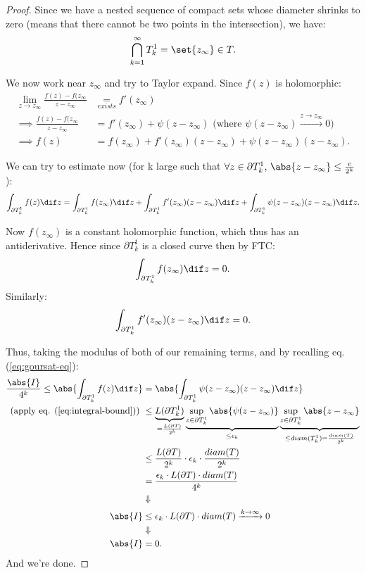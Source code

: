 \begin{proof}
Since we have a nested sequence of compact sets whose diameter shrinks to zero (means that there cannot be two points in the intersection), we have:
\begin{align*}
    \bigcap_{k=1}^\infty T_k^1 = \set{ z_\infty } \in T.
\end{align*}

We now work near $z_\infty$ and try to Taylor expand. Since $f(z)$ is holomorphic:
\begin{align*}
    \lim_{z\rightarrow z_\infty} \frac{f(z) - f(z_\infty}{z-z_\infty} &\underset{exists}{=} f'(z_\infty)\\
    \implies \frac{f(z) - f(z_\infty}{z-z_\infty} &= f'(z_\infty) + \psi(z-z_\infty) \text{ (where $\psi(z-z_\infty) \xrightarrow[]{z \to z_\infty} 0$)}\\
    \implies f(z) &= f(z_\infty)+f'(z_\infty)(z-z_\infty) + \psi(z-z_\infty)(z-z_\infty).
\end{align*}

We can try to estimate now (for k large such that $\forall z\in \partial T_k^1, \, \abs{z-z_\infty} \leq \frac{c}{2^k}$): 
\begin{align*}
    \int_{\partial T_k^1} f(z)  \dif z = \int_{\partial T_k^1} f(z_\infty)  \dif z + \int_{\partial T_k^1} f'(z_\infty)(z-z_\infty)  \dif z + \int_{\partial T_k^1} \psi(z-z_\infty)(z-z_\infty)  \dif z.
\end{align*}

Now $f(z_\infty)$ is a constant holomorphic function, which thus has an antiderivative. Hence since $\partial T_k^1$ is a closed curve then by FTC:
\begin{align*}
    \int_{\partial T_k^1} f(z_\infty)  \dif z = 0.
\end{align*}
Similarly:
\begin{align*}
    \int_{\partial T_k^1} f'(z_\infty)(z-z_\infty)  \dif z = 0.
\end{align*}

Thus, taking the modulus of both of our remaining terms, and by recalling eq. (\ref{eq:goursat-eq}):
\begin{align*}
    \frac{\abs{I}}{4^k} \leq \abs{\int_{\partial T_k^1} f(z)  \dif z} &= \abs{\int_{\partial T_k^1} \psi(z-z_\infty)(z-z_\infty)  \dif z}\\
    \text{(apply eq. (\ref{eq:integral-bound})) } &\leq \underbrace{L(\partial T_k^1)}_{=\frac{L(\partial T)}{2^k}} \underbrace{\sup\limits_{z\in \partial T_k^1}  \abs{\psi(z-z_\infty) }  }_{\leq \epsilon_k}   \underbrace{\sup\limits_{z\in \partial T_k^1} \abs{z-z_\infty}}_{\leq diam(T_k^1) = \frac{diam(T)}{2^k}} \\
    &\leq \frac{L(\partial T)}{2^k} \cdot \epsilon_k \cdot \frac{diam(T)}{2^k}\\
    &= \frac{\epsilon_k \cdot L(\partial T) \cdot diam(T) }{4^k}\\
    &\Downarrow\\
    \abs{I} & \leq \epsilon_k \cdot L(\partial T) \cdot diam(T) \xrightarrow[]{k\rightarrow \infty} 0\\
    &\Downarrow\\
    \abs{I} &= 0.
\end{align*}
And we're done.
\end{proof}
